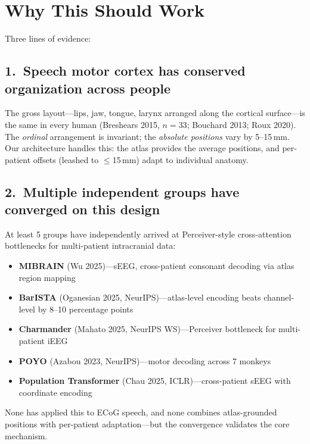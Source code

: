 \documentclass[11pt,letterpaper]{article}
\begin{document}
\section{Why This Should Work}

Three lines of evidence:

\subsection*{1.~Speech motor cortex has conserved organization across people}

The gross layout---lips, jaw, tongue, larynx arranged along the cortical surface---is the same in every human (Breshears 2015, $n{=}33$; Bouchard 2013; Roux 2020). The \textit{ordinal} arrangement is invariant; the \textit{absolute positions} vary by 5--15\,mm. Our architecture handles this: the atlas provides the average positions, and per-patient offsets (leashed to ${\leq}$15\,mm) adapt to individual anatomy.

\subsection*{2.~Multiple independent groups have converged on this design}

At least 5 groups have independently arrived at Perceiver-style cross-attention bottlenecks for multi-patient intracranial data:

\begin{itemize}[leftmargin=2em]
    \item \textbf{MIBRAIN} (Wu 2025)---sEEG, cross-patient consonant decoding via atlas region mapping
    \item \textbf{BarISTA} (Oganesian 2025, NeurIPS)---atlas-level encoding beats channel-level by 8--10 percentage points
    \item \textbf{Charmander} (Mahato 2025, NeurIPS WS)---Perceiver bottleneck for multi-patient iEEG
    \item \textbf{POYO} (Azabou 2023, NeurIPS)---motor decoding across 7 monkeys
    \item \textbf{Population Transformer} (Chau 2025, ICLR)---cross-patient sEEG with coordinate encoding
\end{itemize}

None has applied this to \textmu ECoG speech, and none combines atlas-grounded positions with per-patient adaptation---but the convergence validates the core mechanism.
\end{document}
